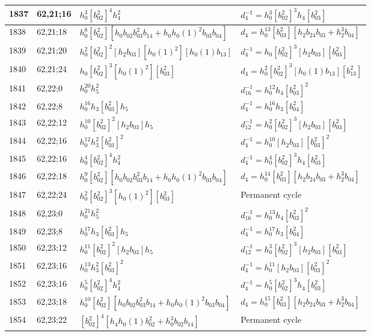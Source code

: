 \documentclass{article}
\begin{document}
\begin{longtable}{|l|l|>{\raggedright\arraybackslash}p{6cm}|>{\raggedright\arraybackslash}p{6cm}|}
1837 & 62,21;16 & $h_0^3[b_{02}^2]^4h_4^2$ & $d_{4}^{-1}=h_0^3[b_{02}^2]^3h_4[b_{03}^2]$\\
\hline
1838 & 62,21;18 & $h_0^8[b_{02}^2][h_0b_{02}b_{03}^2b_{14} + h_0h_0(1)^2b_{03}b_{04}]$ &$d_{4}=h_0^{13}[b_{03}^2][h_2b_{24}b_{03} + h_2^3b_{04}]$\\
\hline
1839 & 62,21;20 & $h_0^2[b_{02}^2]^2[h_2b_{03}][h_0(1)^2][h_0(1)b_{13}]$ & $d_{4}^{-1}=h_0[b_{02}^2]^3[h_2b_{03}][b_{03}^2]$\\
\hline
1840 & 62,21;24 & $h_0[b_{02}^2]^3[h_0(1)^2][b_{03}^2]$ &$d_{4}=h_0^2[b_{02}^2]^3[h_0(1)b_{13}][b_{13}^2]$\\
\hline
1841 & 62,22;0 & $h_0^{20}h_5^2$ & $d_{16}^{-1}=h_0^{12}h_4[b_{03}^2]^2$\\
\hline
1842 & 62,22;8 & $h_0^{16}h_3[b_{03}^2]h_5$ & $d_{4}^{-1}=h_0^{16}h_3[b_{04}^2]$\\
\hline
1843 & 62,22;12 & $h_0^{10}[b_{02}^2]^2[h_2b_{03}]h_5$ & $d_{12}^{-1}=h_0^2[b_{02}^2]^3[h_2b_{03}][b_{03}^2]$\\
\hline
1844 & 62,22;16 & $h_0^{12}h_3^2[b_{03}^2]^2$ & $d_{4}^{-1}=h_0^{10}[h_2b_{03}][b_{03}^2]^2$\\
1845 & 62,22;16 & $h_0^4[b_{02}^2]^4h_4^2$ & $d_{4}^{-1}=h_0^4[b_{02}^2]^3h_4[b_{03}^2]$\\
\hline
1846 & 62,22;18 & $h_0^9[b_{02}^2][h_0b_{02}b_{03}^2b_{14} + h_0h_0(1)^2b_{03}b_{04}]$ &$d_{4}=h_0^{14}[b_{03}^2][h_2b_{24}b_{03} + h_2^3b_{04}]$\\
\hline
1847 & 62,22;24 & $h_0^2[b_{02}^2]^3[h_0(1)^2][b_{03}^2]$ & Permanent cycle\\
\hline
1848 & 62,23;0 & $h_0^{21}h_5^2$ & $d_{16}^{-1}=h_0^{13}h_4[b_{03}^2]^2$\\
\hline
1849 & 62,23;8 & $h_0^{17}h_3[b_{03}^2]h_5$ & $d_{4}^{-1}=h_0^{17}h_3[b_{04}^2]$\\
\hline
1850 & 62,23;12 & $h_0^{11}[b_{02}^2]^2[h_2b_{03}]h_5$ & $d_{12}^{-1}=h_0^3[b_{02}^2]^3[h_2b_{03}][b_{03}^2]$\\
\hline
1851 & 62,23;16 & $h_0^{13}h_3^2[b_{03}^2]^2$ & $d_{4}^{-1}=h_0^{11}[h_2b_{03}][b_{03}^2]^2$\\
1852 & 62,23;16 & $h_0^5[b_{02}^2]^4h_4^2$ & $d_{4}^{-1}=h_0^5[b_{02}^2]^3h_4[b_{03}^2]$\\
\hline
1853 & 62,23;18 & $h_0^{10}[b_{02}^2][h_0b_{02}b_{03}^2b_{14} + h_0h_0(1)^2b_{03}b_{04}]$ &$d_{4}=h_0^{15}[b_{03}^2][h_2b_{24}b_{03} + h_2^3b_{04}]$\\
\hline
1854 & 62,23;22 & $[b_{02}^2]^4[h_4h_0(1)b_{02}^2 + h_0^3b_{02}b_{14}]$ & Permanent cycle\\

\end{longtable}
\end{document}
